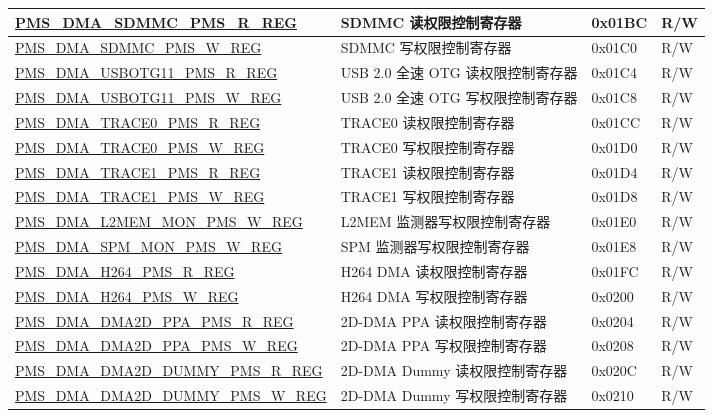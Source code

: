 \begin{longtable}{ | L{7.5cm} | L{6cm} | L{1.3cm} | L{1cm} | }
\hyperref[regdesc:PMSDMASDMMCPMSRREG]{PMS\_DMA\_SDMMC\_PMS\_R\_REG} & SDMMC 读权限控制寄存器 & 0x01BC & R/W \\ \hline
\hyperref[regdesc:PMSDMASDMMCPMSWREG]{PMS\_DMA\_SDMMC\_PMS\_W\_REG} & SDMMC 写权限控制寄存器 & 0x01C0 & R/W \\ \hline
\hyperref[regdesc:PMSDMAUSBOTG11PMSRREG]{PMS\_DMA\_USBOTG11\_PMS\_R\_REG} & USB 2.0 全速 OTG 读权限控制寄存器 & 0x01C4 & R/W \\ \hline
\hyperref[regdesc:PMSDMAUSBOTG11PMSWREG]{PMS\_DMA\_USBOTG11\_PMS\_W\_REG} & USB 2.0 全速 OTG 写权限控制寄存器 & 0x01C8 & R/W \\ \hline
\hyperref[regdesc:PMSDMATRACE0PMSRREG]{PMS\_DMA\_TRACE0\_PMS\_R\_REG} & TRACE0 读权限控制寄存器 & 0x01CC & R/W \\ \hline
\hyperref[regdesc:PMSDMATRACE0PMSWREG]{PMS\_DMA\_TRACE0\_PMS\_W\_REG} & TRACE0 写权限控制寄存器 & 0x01D0 & R/W \\ \hline
\hyperref[regdesc:PMSDMATRACE1PMSRREG]{PMS\_DMA\_TRACE1\_PMS\_R\_REG} & TRACE1 读权限控制寄存器 & 0x01D4 & R/W \\ \hline
\hyperref[regdesc:PMSDMATRACE1PMSWREG]{PMS\_DMA\_TRACE1\_PMS\_W\_REG} & TRACE1 写权限控制寄存器 & 0x01D8 & R/W \\ \hline
\hyperref[regdesc:PMSDMAL2MEMMONPMSWREG]{PMS\_DMA\_L2MEM\_MON\_PMS\_W\_REG} & L2MEM 监测器写权限控制寄存器 & 0x01E0 & R/W \\ \hline
\hyperref[regdesc:PMSDMASPMMONPMSWREG]{PMS\_DMA\_SPM\_MON\_PMS\_W\_REG} & SPM 监测器写权限控制寄存器 & 0x01E8 & R/W \\ \hline
\hyperref[regdesc:PMSDMAH264PMSRREG]{PMS\_DMA\_H264\_PMS\_R\_REG} & H264 DMA 读权限控制寄存器 & 0x01FC & R/W \\ \hline
\hyperref[regdesc:PMSDMAH264PMSWREG]{PMS\_DMA\_H264\_PMS\_W\_REG} & H264 DMA 写权限控制寄存器 & 0x0200 & R/W \\ \hline
\hyperref[regdesc:PMSDMADMA2DPPAPMSRREG]{PMS\_DMA\_DMA2D\_PPA\_PMS\_R\_REG} & 2D-DMA PPA 读权限控制寄存器 & 0x0204 & R/W \\ \hline
\hyperref[regdesc:PMSDMADMA2DPPAPMSWREG]{PMS\_DMA\_DMA2D\_PPA\_PMS\_W\_REG} & 2D-DMA PPA 写权限控制寄存器 & 0x0208 & R/W \\ \hline
\hyperref[regdesc:PMSDMADMA2DDUMMYPMSRREG]{PMS\_DMA\_DMA2D\_DUMMY\_PMS\_R\_REG} & 2D-DMA Dummy 读权限控制寄存器 & 0x020C & R/W \\ \hline
\hyperref[regdesc:PMSDMADMA2DDUMMYPMSWREG]{PMS\_DMA\_DMA2D\_DUMMY\_PMS\_W\_REG} & 2D-DMA Dummy 写权限控制寄存器 & 0x0210 & R/W \\ \hline

\end{longtable}
